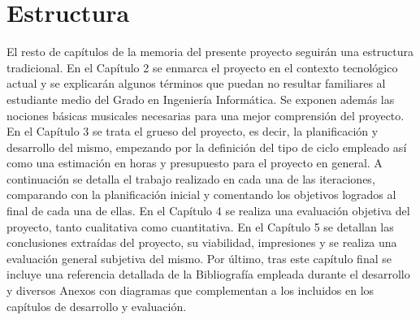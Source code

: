 \section{Estructura}

El resto de capítulos de la memoria del presente proyecto seguirán una estructura tradicional. En el Capítulo 2 se enmarca el proyecto en el contexto tecnológico actual y se explicarán algunos términos que puedan no resultar familiares al estudiante medio del Grado en Ingeniería Informática. Se exponen además las nociones básicas musicales necesarias para una mejor comprensión del proyecto. En el Capítulo 3 se trata el grueso del proyecto, es decir, la planificación y desarrollo del mismo, empezando por la definición del tipo de ciclo empleado así como una estimación en horas y presupuesto para el proyecto en general. A continuación se detalla el trabajo realizado en cada una de las iteraciones, comparando con la planificación inicial y comentando los objetivos logrados al final de cada una de ellas. En el Capítulo 4 se realiza una evaluación objetiva del proyecto, tanto cualitativa como cuantitativa. En el Capítulo 5 se detallan las conclusiones extraídas del proyecto, su viabilidad, impresiones y se realiza una evaluación general subjetiva del mismo. Por último, tras este capítulo final se incluye una referencia detallada de la Bibliografía empleada durante el desarrollo y diversos Anexos con diagramas que complementan a los incluidos en los capítulos de desarrollo y evaluación.
